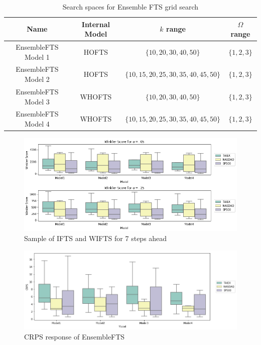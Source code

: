 \begin{table}[htb]
    \centering
    \begin{tabular}{|c|c|c|c|} \hline
        Name & Internal Model & $k$ range & $\Omega$ range  \\ \hline
        EnsembleFTS Model 1 & HOFTS & $\{10, 20, 30, 40, 50\}$ & $\{1, 2, 3\}$ \\ \hline
        EnsembleFTS Model 2 & HOFTS & $\{10, 15, 20, 25, 30, 35, 40, 45, 50\}$ & $\{1, 2, 3\}$ \\ \hline
        EnsembleFTS Model 3 & WHOFTS & $\{10, 20, 30, 40, 50\}$ & $\{1, 2, 3\}$ \\ \hline
        EnsembleFTS Model 4 & WHOFTS & $\{10, 15, 20, 25, 30, 35, 40, 45, 50\}$ & $\{1, 2, 3\}$ \\ \hline
    \end{tabular}
    \caption{Search spaces for Ensemble FTS grid search}
    \label{tab:ensemblefts_gridsearch}
\end{table}

\begin{figure}[htb]
    \centering
    \includegraphics[width=\textwidth]{figures/ensemblefts_winklerscore.png}
    \caption{Sample of IFTS and WIFTS for 7 steps ahead}
    \label{fig:ensemblefts_winklerscore}
\end{figure}

\begin{figure}[htb]
    \centering
    \includegraphics[width=\textwidth]{figures/ensemblefts_crps.png}
    \caption{CRPS response of EnsembleFTS}
    \label{fig:ensemblefts_crps}
\end{figure}

